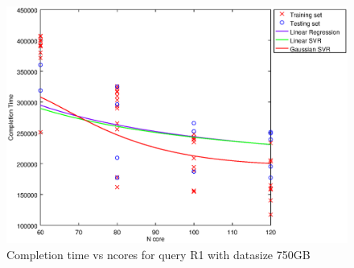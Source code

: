 
\begin {figure}[hbtp]
\centering
\includegraphics[width=\textwidth]{output/R1_750_1_OVER_NCORES/plot_R1_750_bestmodels.eps}
\caption{Completion time vs ncores for query R1 with datasize 750GB}
\label{fig:all_nonlinear_R1_750}
\end {figure}
